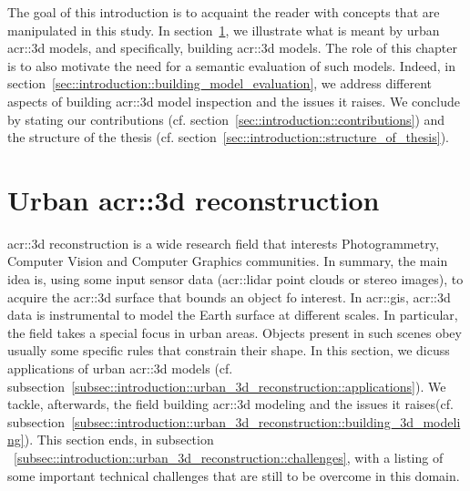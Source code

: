 \minitoc

\vfill

The goal of this introduction is to acquaint the reader with concepts that are manipulated in this study.
In section~\ref{sec::introduction::urban_3d_reconstruction}, we illustrate what is meant by urban \gls{acr::3d} models, and specifically,  building \gls{acr::3d} models.
The role of this chapter is to also motivate the need for a semantic evaluation of such models.
Indeed, in section~\ref{sec::introduction::building_model_evaluation}, we address different aspects of building \gls{acr::3d} model inspection and the issues it raises.
We conclude by stating our contributions (cf. section~\ref{sec::introduction::contributions}) and the structure of the thesis (cf. section~\ref{sec::introduction::structure_of_thesis}).

\clearpage

\section{Urban \acrshort*{acr::3d} reconstruction}
    \label{sec::introduction::urban_3d_reconstruction}
    \gls{acr::3d} reconstruction is a wide research field that interests Photogrammetry, Computer Vision and Computer Graphics communities.
    In summary, the main idea is, using some input sensor data (\gls{acr::lidar} point clouds or stereo images), to acquire the \gls{acr::3d} surface that bounds an object fo interest.
    In \gls{acr::gis}, \gls{acr::3d} data is instrumental to model the Earth surface at different scales.
    In particular, the field takes a special focus in urban areas.
    Objects present in such scenes obey usually some specific rules that constrain their shape.
    In this section, we dicuss applications of urban \gls{acr::3d} models (cf. subsection~\ref{subsec::introduction::urban_3d_reconstruction::applications}).
    We tackle, afterwards, the field  building \gls{acr::3d} modeling and the issues it raises(cf. subsection~\ref{subsec::introduction::urban_3d_reconstruction::building_3d_modeling}).
    This section ends, in subsection ~\ref{subsec::introduction::urban_3d_reconstruction::challenges}, with a listing of some important technical challenges that are still to be overcome in this domain.

